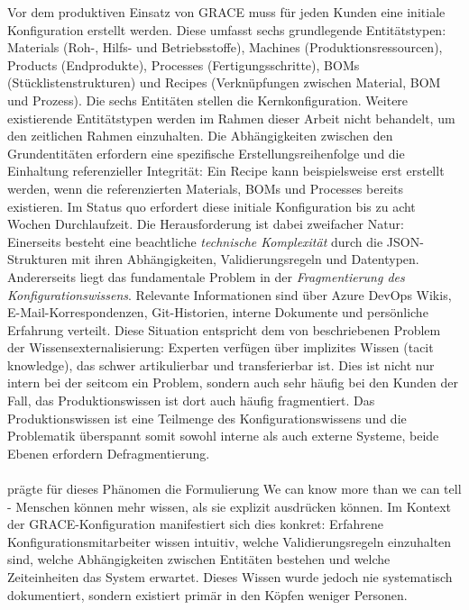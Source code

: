 Vor dem produktiven Einsatz von GRACE muss für jeden Kunden eine initiale Konfiguration erstellt werden. Diese umfasst sechs grundlegende Entitätstypen: Materials (Roh-, Hilfs- und Betriebsstoffe), Machines (Produktionsressourcen), Products (Endprodukte), Processes (Fertigungsschritte), BOMs (Stücklistenstrukturen) und Recipes (Verknüpfungen zwischen Material, BOM und Prozess). Die sechs Entitäten stellen die Kernkonfiguration. Weitere existierende Entitätstypen werden im Rahmen dieser Arbeit nicht behandelt, um den zeitlichen Rahmen einzuhalten. Die Abhängigkeiten zwischen den Grundentitäten erfordern eine spezifische Erstellungsreihenfolge und die Einhaltung referenzieller Integrität: Ein Recipe kann beispielsweise erst erstellt werden, wenn die referenzierten Materials, BOMs und Processes bereits existieren. Im Status quo erfordert diese initiale Konfiguration bis zu acht Wochen Durchlaufzeit. Die Herausforderung ist dabei zweifacher Natur: Einerseits besteht eine beachtliche \textit{technische Komplexität} durch die JSON-Strukturen mit ihren Abhängigkeiten, Validierungsregeln und Datentypen. Andererseits liegt das fundamentale Problem in der \textit{Fragmentierung des Konfigurationswissens}. Relevante Informationen sind über Azure DevOps Wikis, E-Mail-Korrespondenzen, Git-Historien, interne Dokumente und persönliche Erfahrung verteilt. Diese Situation entspricht dem von \cite{nonaka:knowledge_creating_company1995} beschriebenen Problem der Wissensexternalisierung: Experten verfügen über implizites Wissen (\glqq tacit knowledge\grqq{}), das schwer artikulierbar und transferierbar ist.
Dies ist nicht nur intern bei der seitcom ein Problem, sondern auch sehr häufig bei den Kunden der Fall, das Produktionswissen ist dort auch häufig fragmentiert. Das Produktionswissen ist eine Teilmenge des Konfigurationswissens und die Problematik überspannt somit sowohl interne als auch externe Systeme, beide Ebenen erfordern Defragmentierung. 
\\\\
\cite{polanyi:tacit_dimension1966} prägte für dieses Phänomen die Formulierung \glqq We can know more than we can tell\grqq{} - Menschen können mehr wissen, als sie explizit ausdrücken können. Im Kontext der GRACE-Konfiguration manifestiert sich dies konkret: Erfahrene Konfigurationsmitarbeiter wissen intuitiv, welche Validierungsregeln einzuhalten sind, welche Abhängigkeiten zwischen Entitäten bestehen und welche Zeiteinheiten das System erwartet. Dieses Wissen wurde jedoch nie systematisch dokumentiert, sondern existiert primär in den Köpfen weniger Personen.
